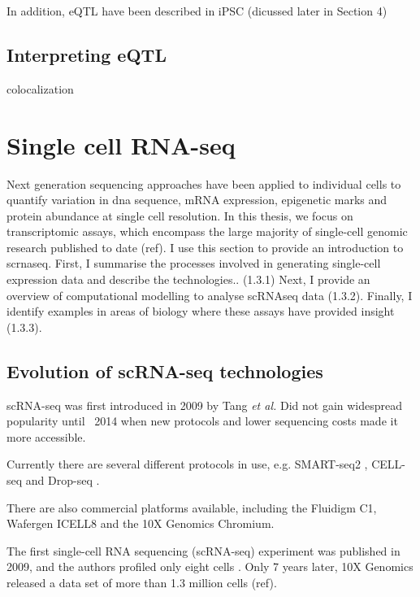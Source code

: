 In addition, eQTL have been described in iPSC (dicussed later in Section 4)

\subsection{Interpreting eQTL}

colocalization

\newpage

\section{Single cell RNA-seq}  %

Next generation sequencing approaches have been applied to individual cells to quantify variation in \gls{dna} sequence, mRNA expression, epigenetic marks and protein abundance at single cell resolution.
In this thesis, we focus on transcriptomic assays, which encompass the large majority of single-cell genomic research published to date (ref). 
I use this section to provide an introduction to \gls{scrnaseq}.
First, I summarise the processes involved in generating single-cell expression data and describe the technologies.. (1.3.1)
Next, I provide an overview of computational modelling to analyse scRNAseq data (1.3.2).
Finally, I identify examples in areas of biology where these assays have provided insight (1.3.3).


\subsection{Evolution of scRNA-seq technologies}

scRNA-seq was first introduced in 2009 by Tang \textit{et al.} \cite{tang2009mrna}
Did not gain widespread popularity until ~2014 when new protocols and lower sequencing costs made it more accessible.

Currently there are several different protocols in use, e.g. SMART-seq2 \cite{picelli2013smart}, CELL-seq \cite{hashimshony2012cel} and Drop-seq \cite{macosko2015highly}.

There are also commercial platforms available, including the Fluidigm C1, Wafergen ICELL8 and the 10X Genomics Chromium.

The first single-cell RNA sequencing (scRNA-seq) experiment was published in 2009, and the authors profiled only eight cells \cite{tang2009mrna}. 
Only 7 years later, 10X Genomics released a data set of more than 1.3 million cells (ref).

